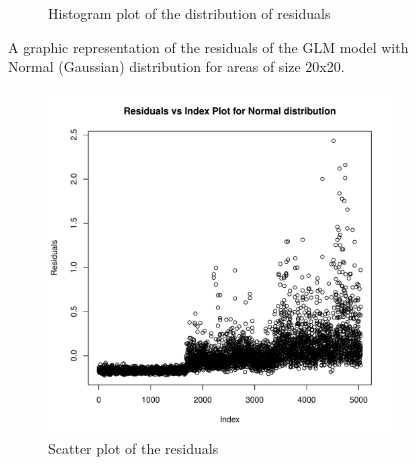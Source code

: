 \documentclass[12pt,a4paper,twoside]{article}
\begin{document}
\begin{figure}[!ht]
\begin{subfigure}{.45\textwidth}
        \caption{Histogram plot of the distribution of residuals}
        \label{fig:gaussianhist20}
    \end{subfigure}
    \caption{A graphic representation of the residuals of the GLM model with Normal (Gaussian)
        distribution for areas of size 20x20.}
    \label{fig:gaussianfig20}
\end{figure}

\begin{figure}[!ht]
    \begin{subfigure}{.45\textwidth}
        \centering
        \includegraphics[width=\linewidth]{img/Normal_distribution_40x40.pdf}
        \caption{Scatter plot of the residuals}
        \label{fig:gaussianscatter40}
    \end{subfigure}
    \begin{subfigure}{.45\textwidth}
        \centering

\end{subfigure}
\end{figure}
\end{document}

